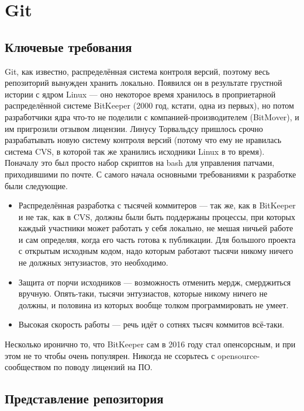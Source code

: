 \documentclass{../../text-style}
\begin{document}
\section{Git}

\subsection{Ключевые требования}

Git, как известно, распределённая система контроля версий, поэтому весь репозиторий вынужден хранить локально. Появился он в результате грустной истории с ядром Linux --- оно некоторое время хранилось в проприетарной распределённой системе BitKeeper (2000 год, кстати, одна из первых), но потом разработчики ядра что-то не поделили с компанией-производителем (BitMover), и им пригрозили отзывом лицензии. Линусу Торвальдсу пришлось срочно разрабатывать новую систему контроля версий (потому что ему не нравилась система CVS, в которой так же хранились исходники Linux в то время). Поначалу это был просто набор скриптов на bash для управления патчами, приходившими по почте. С самого начала основными требованиями к разработке были следующие.

\begin{itemize}
    \item Распределённая разработка с тысячей коммитеров --- так же, как в BitKeeper и не так, как в CVS, должны были быть поддержаны процессы, при которых каждый участники может работать у себя локально, не мешая ничьей работе и сам определяя, когда его часть готова к публикации. Для большого проекта с открытым исходным кодом, надо которым работают тысячи никому ничего не должных энтузиастов, это необходимо.
    \item Защита от порчи исходников --- возможность отменить мердж, смерджиться вручную. Опять-таки, тысячи энтузиастов, которые никому ничего не должны, и половина из которых вообще толком программировать не умеет.
    \item Высокая скорость работы --- речь идёт о сотнях тысяч коммитов всё-таки.
\end{itemize}

Несколько иронично то, что BitKeeper сам в 2016 году стал опенсорсным, и при этом не то чтобы очень популярен. Никогда не ссорьтесь с opensource-сообществом по поводу лицензий на ПО.

\subsection{Представление репозитория}
\end{document}
